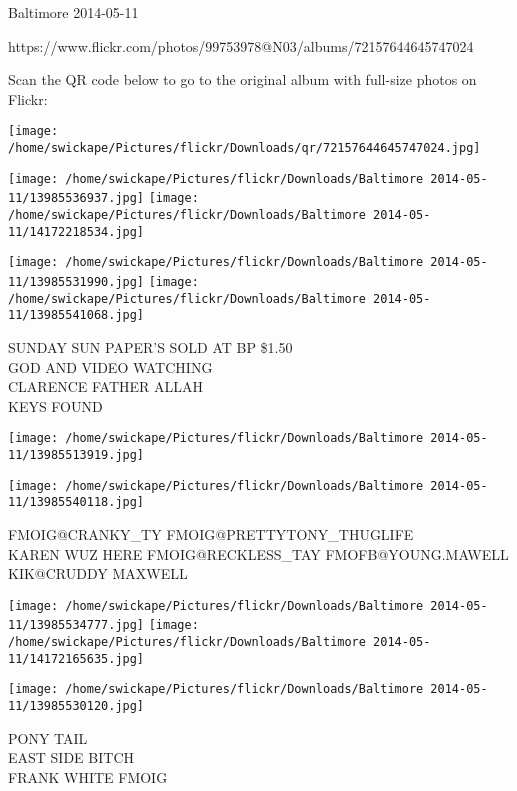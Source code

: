 \documentclass[10pt,letterpaper]{article}
\begin{document}
Baltimore 2014-05-11

https://www.flickr.com/photos/99753978@N03/albums/72157644645747024

Scan the QR code below to go to the original album with full-size photos on Flickr:

\texttt{[image: /home/swickape/Pictures/flickr/Downloads/qr/72157644645747024.jpg]}
\pagebreak

\texttt{[image: /home/swickape/Pictures/flickr/Downloads/Baltimore 2014-05-11/13985536937.jpg]}
\texttt{[image: /home/swickape/Pictures/flickr/Downloads/Baltimore 2014-05-11/14172218534.jpg]}

\texttt{[image: /home/swickape/Pictures/flickr/Downloads/Baltimore 2014-05-11/13985531990.jpg]}
\texttt{[image: /home/swickape/Pictures/flickr/Downloads/Baltimore 2014-05-11/13985541068.jpg]}

SUNDAY SUN PAPER'S SOLD AT BP \$1.50\\
GOD AND VIDEO WATCHING\\
CLARENCE FATHER ALLAH\\
KEYS FOUND\\
\pagebreak

\texttt{[image: /home/swickape/Pictures/flickr/Downloads/Baltimore 2014-05-11/13985513919.jpg]}

\vspace{0.25in}
\texttt{[image: /home/swickape/Pictures/flickr/Downloads/Baltimore 2014-05-11/13985540118.jpg]}

FMOIG@CRANKY\_TY FMOIG@PRETTYTONY\_THUGLIFE\\
KAREN WUZ HERE FMOIG@RECKLESS\_TAY FMOFB@YOUNG.MAWELL KIK@CRUDDY MAXWELL\\
\pagebreak

\texttt{[image: /home/swickape/Pictures/flickr/Downloads/Baltimore 2014-05-11/13985534777.jpg]}
\texttt{[image: /home/swickape/Pictures/flickr/Downloads/Baltimore 2014-05-11/14172165635.jpg]}

\vspace{0.25in}
\texttt{[image: /home/swickape/Pictures/flickr/Downloads/Baltimore 2014-05-11/13985530120.jpg]}

PONY TAIL\\
EAST SIDE BITCH\\
FRANK WHITE FMOIG\\
\pagebreak
\end{document}
